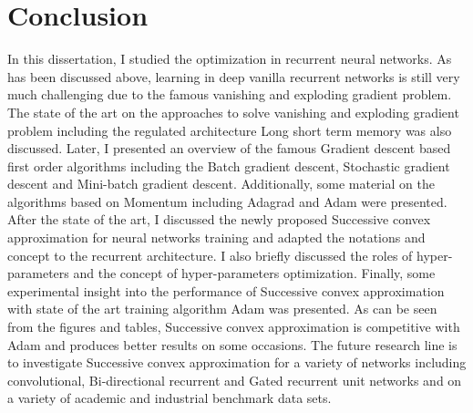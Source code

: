 \section {Conclusion}

In this dissertation, I studied the optimization in recurrent neural networks. As has been discussed above, learning in deep vanilla recurrent networks is still very much challenging due to the famous vanishing and exploding gradient problem. The state of the art on the approaches to solve vanishing and exploding gradient problem including the regulated architecture Long short term memory was also discussed.  Later, I presented an overview of the famous Gradient descent based first order algorithms including the Batch gradient descent, Stochastic gradient descent and Mini-batch gradient descent. Additionally, some material on the algorithms based on Momentum including Adagrad and Adam were presented. After the state of the art, I discussed the newly proposed Successive convex approximation for neural networks training and adapted the notations and concept to the recurrent architecture. I also briefly discussed the roles of hyper-parameters and the concept of hyper-parameters optimization. Finally, some experimental insight into the performance of Successive convex approximation with state of the art training algorithm Adam was presented. As can be seen from the figures and tables, Successive convex approximation is competitive with Adam and produces better results on some occasions. The future research line is to investigate Successive convex approximation for a variety of networks including convolutional, Bi-directional recurrent and Gated recurrent unit networks and on a variety of academic and industrial benchmark data sets.    






